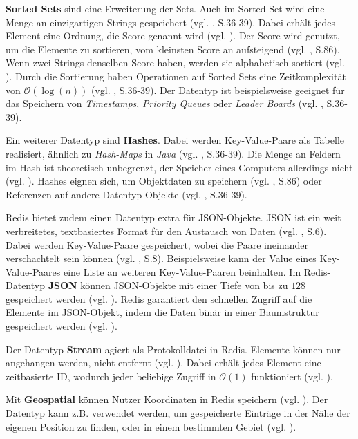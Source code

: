 \textbf{Sorted Sets} sind eine Erweiterung der Sets. Auch im Sorted Set wird eine Menge an einzigartigen Strings gespeichert (vgl. \cite{4}, S.36-39). Dabei erhält jedes Element eine Ordnung, die Score genannt wird (vgl. \cite{Redis-Docs-SoSe}). Der Score wird genutzt, um die Elemente zu sortieren, vom kleinsten Score an aufsteigend (vgl. \cite{nosql}, S.86). Wenn zwei Strings denselben Score haben, werden sie alphabetisch sortiert (vgl. \cite{Redis-Docs-SoSe}). Durch die Sortierung haben Operationen auf Sorted Sets eine Zeitkomplexität von $\mathcal{O}(\log(n))$ (vgl. \cite{4}, S.36-39). Der Datentyp ist beispielsweise geeignet für das Speichern von \textit{Timestamps}, \textit{Priority Queues} oder \textit{Leader Boards} (vgl. \cite{4}, S.36-39).

Ein weiterer Datentyp sind \textbf{Hashes}. Dabei werden Key-Value-Paare als Tabelle realisiert, ähnlich zu \textit{Hash-Maps} in \textit{Java} (vgl. \cite{4}, S.36-39). Die Menge an Feldern im Hash ist theoretisch unbegrenzt, der Speicher eines Computers allerdings nicht (vgl. \cite{Redis-Docs-Hash}). Hashes eignen sich, um Objektdaten zu speichern (vgl. \cite{nosql}, S.86) oder Referenzen auf andere Datentyp-Objekte (vgl. \cite{4}, S.36-39).

\ac{Redis} bietet zudem einen Datentyp extra für \ac{JSON}-Objekte. \ac{JSON} ist ein weit verbreitetes, textbasiertes Format für den Austausch von Daten (vgl. \cite{14}, S.6). Dabei werden Key-Value-Paare gespeichert, wobei die Paare ineinander verschachtelt sein können (vgl. \cite{14}, S.8). Beispielsweise kann der Value eines Key-Value-Paares eine Liste an weiteren Key-Value-Paaren beinhalten. Im \ac{Redis}-Datentyp \textbf{JSON} können \ac{JSON}-Objekte mit einer Tiefe von bis zu $128$ gespeichert werden (vgl. \cite{Redis-Docs-JSON}). \ac{Redis} garantiert den schnellen Zugriff auf die Elemente im \ac{JSON}-Objekt, indem die Daten binär in einer Baumstruktur gespeichert werden (vgl. \cite{Redis-Docs-JSON}).

Der Datentyp \textbf{Stream} agiert als Protokolldatei in \ac{Redis}. Elemente können nur angehangen werden, nicht entfernt (vgl. \cite{Redis-Docs-Stream}). Dabei erhält jedes Element eine zeitbasierte ID, wodurch jeder beliebige Zugriff in $\mathcal{O}(1)$ funktioniert (vgl. \cite{Redis-Docs-Stream}).

Mit \textbf{Geospatial} können Nutzer Koordinaten in \ac{Redis} speichern (vgl. \cite{Redis-Docs-Geospatial}). Der Datentyp kann z.B. verwendet werden, um gespeicherte Einträge in der Nähe der eigenen Position zu finden, oder in einem bestimmten Gebiet (vgl. \cite{Redis-Docs-Geospatial}).

